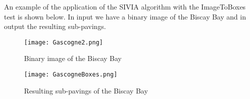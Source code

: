 An example of the application of the SIVIA algorithm with the ImageToBoxes test is shown below. In input we have a binary image of the Biscay Bay and in output the resulting sub-pavings.

\begin{figure}[!h] 
\center
\texttt{[image: Gascogne2.png]} 
\caption{Binary image of the Biscay Bay } 
\label{fig: Biscay Bay}
\end{figure}

\begin{figure}[!h] 
\center
\texttt{[image: GascogneBoxes.png]} 
\caption{Resulting sub-pavings of the Biscay Bay } 
\label{fig: Sub-pavings of the Biscay Bay}
\end{figure}


